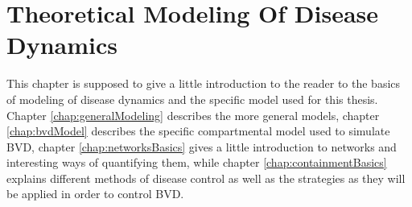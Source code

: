 \chapter{Theoretical Modeling Of Disease Dynamics} 
This chapter is supposed to give a little introduction to the reader to the basics of modeling of disease dynamics and the specific model used for this thesis. Chapter \ref{chap:generalModeling} describes the more general models, chapter \ref{chap:bvdModel} describes the specific compartmental model used to simulate BVD, chapter \ref{chap:networksBasics} gives a little introduction to networks and interesting ways of quantifying them, while chapter \ref{chap:containmentBasics} explains different methods of disease control as well as the strategies as they will be applied in order to control BVD.




